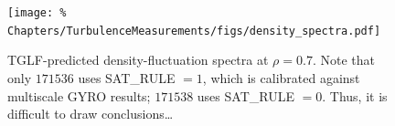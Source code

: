 \begin{figure}[h!]
  \centering
  \texttt{[image: \%
    Chapters/TurbulenceMeasurements/figs/density\_spectra.pdf]}
  \caption[TGLF-predicted density-fluctuation spectra at $\rho=0.7$]{%
    TGLF-predicted density-fluctuation spectra at $\rho=0.7$.
    Note that only $171536$ uses SAT\_RULE $= 1$,
    which is calibrated against multiscale GYRO results;
    $171538$ uses SAT\_RULE $= 0$.
    Thus, it is difficult to draw conclusions\ldots
  }
\label{fig:TurbulenceMeasurements:density_spectra}
\end{figure}




